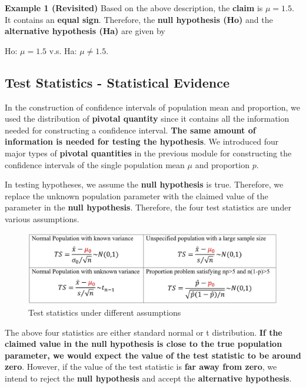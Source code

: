 \documentclass[
]{book}
\begin{document}
\textbf{Example 1 (Revisited)} Based on the above description, the \textbf{claim} is \(\mu = 1.5\). It contains an \textbf{equal sign}. Therefore, the \textbf{null hypothesis (Ho)} and the \textbf{alternative hypothesis (Ha)} are given by

Ho: \(\mu = 1.5\) v.s. Ha: \(\mu \ne 1.5\).

\hypertarget{test-statistics---statistical-evidence}{%
\subsection{Test Statistics - Statistical Evidence}\label{test-statistics---statistical-evidence}}

In the construction of confidence intervals of population mean and proportion, we used the distribution of \textbf{pivotal quantity} since it contains all the information needed for constructing a confidence interval. \textbf{{The same amount of information is needed for testing the hypothesis}}. We introduced four major types of \textbf{pivotal quantities} in the previous module for constructing the confidence intervals of the single population mean \(\mu\) and proportion \(p\).

In testing hypotheses, we assume the \textbf{null hypothesis} is true. Therefore, we replace the unknown population parameter with the claimed value of the parameter in the \textbf{null hypothesis}. Therefore, the four test statistics are under various assumptions.

\begin{figure}

{\centering \includegraphics[width=0.8\linewidth]{img07/w07-Test-Statistics} 

}

\caption{Test statistics under different assumptions}\label{fig:unnamed-chunk-110}
\end{figure}

The above four statistics are either standard normal or t distribution. \textbf{If the claimed value in the null hypothesis is close to the true population parameter, we would expect the value of the test statistic to be around zero}. However, if the value of the test statistic is \textbf{far away from zero}, we intend to reject the \textbf{null hypothesis} and accept the \textbf{alternative hypothesis}.
\end{document}
